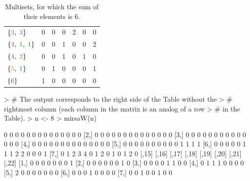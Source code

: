 \documentclass[12pt]{article}
\begin{document}
\begin{table}
\begin{tabular}{|l|ccccc|c|}
  $\{{\color{c3}3}, \; {\color{c3}3}\}$ & 
  \color{c6}0 & \color{c5}0 & \color{c4}0 & \color{c3}2 & \color{c2}0 & 
  \color{c1}0                                                                 \\
  $\{{\color{c4}4}, \; {\color{c1}1}, \; {\color{c1}1}\}$ & 
  \color{c6}0 & \color{c5}0 & \color{c4}1 & \color{c3}0 & \color{c2}0 & 
  \color{c1}2                                                                 \\
  $\{{\color{c4}4}, \; {\color{c2}2}\}$ & 
  \color{c6}0 & \color{c5}0 & \color{c4}1 & \color{c3}0 & \color{c2}1 & 
  \color{c1}0                                                                 \\
  $\{{\color{c5}5}, \; {\color{c1}1}\}$ & 
  \color{c6}0 & \color{c5}1 & \color{c4}0 & \color{c3}0 & \color{c2}0 & 
  \color{c1}1                                                                 \\
  $\{{\color{c6}6}\}$ & 
  \color{c6}1 & \color{c5}0 & \color{c4}0 & \color{c3}0 & \color{c2}0 & 
  \color{c1}0                                                                 \\  
  \hline
  \end{tabular}
  \caption{Multisets, for which the sum of their elements is $6$.}
  \label{tab:ex4}
\end{table}  

\begin{Schunk}
\begin{Sinput}
> # The output corresponds to the right side of the Table without the 
> # rightmost column (each column in the matrix is an analog of a row 
> # in the Table).
> n <- 8
> mirsaW(n)
\end{Sinput}
\begin{Soutput}
     [,1] [,2] [,3] [,4] [,5] [,6] [,7] [,8] [,9] [,10] [,11] [,12] [,13] [,14]
[1,]    0    0    0    0    0    0    0    0    0     0     0     0     0     0
[2,]    0    0    0    0    0    0    0    0    0     0     0     0     0     0
[3,]    0    0    0    0    0    0    0    0    0     0     0     0     0     0
[4,]    0    0    0    0    0    0    0    0    0     0     0     0     0     0
[5,]    0    0    0    0    0    0    0    0    0     0     1     1     1     1
[6,]    0    0    0    0    0    1    1    1    2     2     0     0     0     1
[7,]    0    1    2    3    4    0    1    2    0     1     0     1     2     0
     [,15] [,16] [,17] [,18] [,19] [,20] [,21] [,22]
[1,]     0     0     0     0     0     0     0     1
[2,]     0     0     0     0     0     0     1     0
[3,]     0     0     0     0     1     1     0     0
[4,]     0     1     1     1     0     0     0     0
[5,]     2     0     0     0     0     0     0     0
[6,]     0     0     0     1     0     0     0     0
[7,]     0     0     1     0     0     1     0     0
\end{Soutput}
\end{Schunk}
\end{document}
